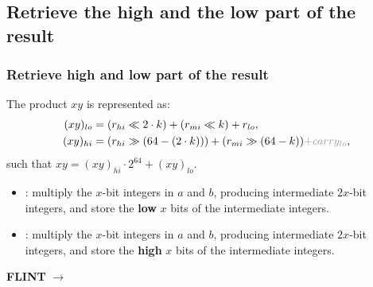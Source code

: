 \documentclass[10pt]{beamer}
\begin{document}
\subsection{Retrieve the high and the low part of the result}
\begin{frame}
    \frametitle{Retrieve high and low part of the result}
    \begin{mybox}
        The product $xy$ is represented as:
        \begin{align*}
            (xy)_{lo} &= (r_{hi} \ll 2\cdot k) + (r_{mi} \ll k) + r_{lo}, \\
            (xy)_{hi} &= (r_{hi} \gg (64 - (2\cdot k))) + (r_{mi} \gg (64 - k)) \textcolor{white!60!black}{ + carry_{lo}},
        \end{align*}
        such that $xy = (xy)_{hi}\cdot 2^{64} + (xy)_{lo}$.
    \end{mybox}

    \pause
    \begin{itemize}
        \item {}: multiply the $x$-bit integers in $a$ and $b$, producing intermediate $2x$-bit integers, 
        and store the \textbf{low} $x$ bits of the intermediate integers.
        \item {}: multiply the $x$-bit integers in $a$ and $b$, producing intermediate $2x$-bit integers, 
        and store the \textbf{high} $x$ bits of the intermediate integers.
    \end{itemize}

    \pause
    \medskip
    \textbf{FLINT} $\longrightarrow$ 
    \begin{table}[h!]
        \centering
    \end{table}


\end{frame}
\end{document}
